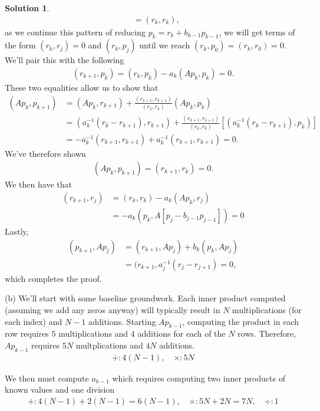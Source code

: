 \documentclass[12pt]{article}
\theoremstyle{definition}
\newtheorem{sol}{Solution}
\theoremstyle{remark}
\begin{document}
\begin{sol}
\begin{align*}
                       &= (r_{k}, r_{k}),
    \end{align*}
    as we continue this pattern of reducing $p_{k} = r_{k} + b_{k-1} p_{k-1}$, we will get terms of the form $(r_{k}, r_{j}) = 0$ and $(r_{k}, p_{j})$ until we reach $(r_{k}, p_{0}) = (r_{k}, r_{0}) = 0$. We'll pair this with the following
    \begin{align*}
        (r_{k+1}, p_{k}) = (r_{k}, p_{k}) - a_{k} (A p_{k}, p_{k}) = 0.
    \end{align*}
    These two equalities allow us to show that
    \begin{align*}
        (Ap_{k}, p_{k+1}) &= (Ap_{k}, r_{k+1}) + \frac{(r_{k+1}, r_{k+1})}{(r_{k}, r_{k})} (A p_{k}, p_{k})\\
                          &= (a^{-1}_{k}(r_{k} - r_{k+1}), r_{k+1}) +  \frac{(r_{k+1}, r_{k+1})}{(r_{k}, r_{k})} \left[  (a^{-1}_{k}(r_{k} - r_{k+1}), p_{k}) \right]\\
                          &= -a_{k}^{-1}(r_{k+1}, r_{k+1}) + a_{k}^{-1}(r_{k+1}, r_{k+1}) = 0.
    \end{align*}
We've therefore shown
\begin{align*}
    (Ap_{k}, p_{k+1}) = (r_{k+1}, r_{k}) = 0.
\end{align*}
We then have that
\begin{align*}
    (r_{k+1}, r_{j}) &= (r_{k}, r_{k}) - a_{k} (Ap_{k}, r_{j})\\ 
                     &= - a_{k} (p_{k}, A [p_{j} - b_{j-1}p_{j-1}]) = 0
\end{align*}
Lastly, 
\begin{align*}
    (p_{k+1}, A p_{j}) &= (r_{k+1}, Ap_{j}) + b_{k}(p_{k}, Ap_{j})\\
                       &= (r_{k+1}, a_{j}^{-1}(r_{j} - r_{j+1}) = 0,
\end{align*}
which completes the proof.

(b) We'll start with some baseline groundwork. Each inner product computed (assuming we add any zeros anyway) will typically result in $N$ multiplications (for each index) and $N - 1$ additions. Starting $A p_{k-1}$, computing the product in each row requires $5$ multiplications and $4$ additions for each of the $N$ rows. Therefore,  $A p_{k-1}$ requires $5N$ multplications and $4N$ additions. 
\begin{align*}
    +: 4(N-1), \quad  \times: 5N
\end{align*}

We then must compute $a_{k-1}$ which requires computing two inner products of known values and one division
\begin{align*}
    +: 4(N-1)  + 2(N-1) = 6(N-1), \quad  \times: 5N + 2N = 7N, \quad \div: 1
\end{align*}


\end{sol}
\end{document}

